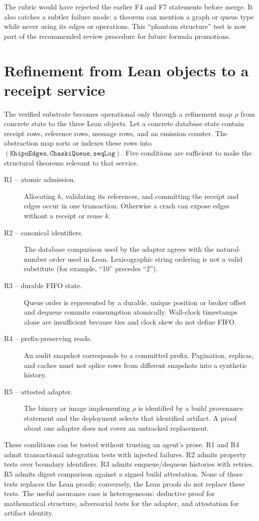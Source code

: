 \documentclass[11pt,letterpaper]{article}
\theoremstyle{definition}
\begin{document}
The rubric would have rejected the earlier F4 and F7 statements before merge.
It also catches a subtler failure mode: a theorem can mention a graph or queue
type while never using its edges or operations. This ``phantom structure'' test
is now part of the recommended review procedure for future formula promotions.

\section{Refinement from Lean objects to a receipt service}
\label{sec:refinement}

The verified substrate becomes operational only through a refinement map
$\rho$ from concrete state to the three Lean objects. Let a concrete database
state contain receipt rows, reference rows, message rows, and an emission
counter. The abstraction map sorts or indexes these rows into
$(\texttt{KhipuEdges},\texttt{ChaskiQueue},\texttt{seqLog})$. Five conditions
are sufficient to make the structural theorems relevant to that service.

\begin{description}
\item[R1 -- atomic admission.] Allocating $k$, validating its references, and
committing the receipt and edges occur in one transaction. Otherwise a crash
can expose edges without a receipt or reuse $k$.
\item[R2 -- canonical identifiers.] The database comparison used by the
adapter agrees with the natural-number order used in Lean. Lexicographic string
ordering is not a valid substitute (for example, ``10'' precedes ``2'').
\item[R3 -- durable FIFO state.] Queue order is represented by a durable,
unique position or broker offset and dequeue commits consumption atomically.
Wall-clock timestamps alone are insufficient because ties and clock skew do
not define FIFO.
\item[R4 -- prefix-preserving reads.] An audit snapshot corresponds to a
committed prefix. Pagination, replicas, and caches must not splice rows from
different snapshots into a synthetic history.
\item[R5 -- attested adapter.] The binary or image implementing $\rho$ is
identified by a build provenance statement and the deployment selects that
identified artifact. A proof about one adapter does not cover an untracked
replacement.
\end{description}

These conditions can be tested without trusting an agent's prose. R1 and R4
admit transactional integration tests with injected failures. R2 admits
property tests over boundary identifiers. R3 admits enqueue/dequeue histories
with retries. R5 admits digest comparison against a signed build attestation.
None of these tests replaces the Lean proofs; conversely, the Lean proofs do
not replace these tests. The useful assurance case is heterogeneous: deductive
proof for mathematical structure, adversarial tests for the adapter, and
attestation for artifact identity.
\end{document}
